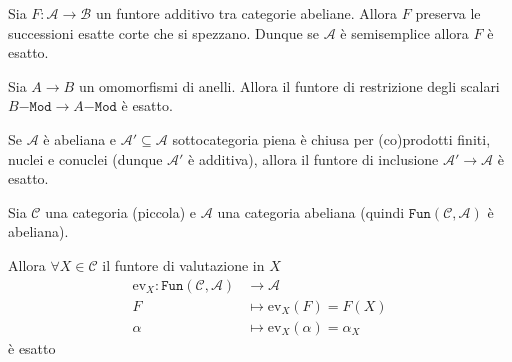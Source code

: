 \begin{remark}{}
    Sia \(F: \mathcal{A} \to \mathcal{B}\) un funtore additivo tra categorie
    abeliane. Allora \(F\) preserva le successioni esatte corte che si spezzano.
    Dunque se \(\mathcal{A}\) è semisemplice allora \(F\) è esatto.
\end{remark}

\begin{example}{}
    Sia \(A \to B\) un omomorfismi di anelli. Allora il funtore di restrizione
    degli scalari \(B\mathtt{-Mod} \to A\mathtt{-Mod}\) è esatto. 
\end{example}

\begin{example}{}
    Se \(\mathcal{A}\) è abeliana e \(\mathcal{A}' \subseteq \mathcal{A} \)
    sottocategoria piena è chiusa per (co)prodotti finiti, nuclei e conuclei
    (dunque \(\mathcal{A}'\) è additiva), allora il funtore di inclusione \(\mathcal{A}' \to \mathcal{A}\) è esatto.
\end{example}

\begin{example}{}
    Sia \(\mathcal{C}\) una categoria (piccola) e \(\mathcal{A}\) una categoria
    abeliana (quindi \(\mathtt{Fun}{(\mathcal{C}, \mathcal{A})}\) è abeliana).

    Allora \(\forall X \in \mathcal{C}\) il funtore di valutazione in \(X\)
    \begin{align*}
        \mathrm{ev}_X: \mathtt{Fun}{(\mathcal{C}, \mathcal{A})} &\longrightarrow \mathcal{A} \\
        F &\longmapsto \mathrm{ev}_X(F) = F{(X)}\\
        \alpha &\longmapsto \mathrm{ev}_X(\alpha) = \alpha_X
    \end{align*}
    è esatto
\end{example}

